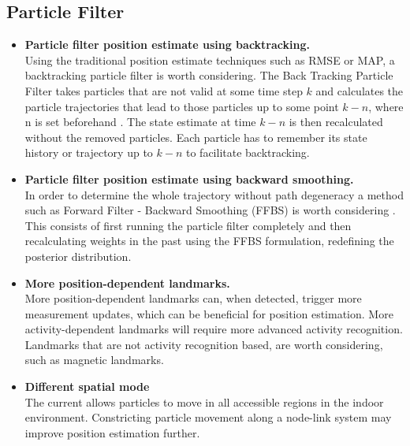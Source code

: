 \subsection{Particle Filter}

\begin{itemize}
	\item \textbf{Particle filter position estimate using backtracking.} \\
	Using the traditional position estimate techniques such as RMSE or MAP, a backtracking particle filter is worth considering. The Back Tracking Particle Filter takes particles that are not valid at some time step $ k $ and calculates the particle trajectories that lead to those particles up to some point $ k - n $, where n is set beforehand \cite{Widyawan2008}. The state estimate at time $ k-n $ is then recalculated without the removed particles. Each particle has to remember its state history or trajectory up to $ k-n $ to facilitate backtracking.
	
	\item \textbf{Particle filter position estimate using backward smoothing.}\\
	In order to determine the whole trajectory without path degeneracy a method such as Forward Filter - Backward Smoothing (FFBS) is worth considering \cite{Lindsten2013, Nurminen2013}. This consists of first running the particle filter completely and then recalculating weights in the past using the FFBS formulation, redefining the posterior distribution.
	
	\item \textbf{More position-dependent landmarks.}\\
	More position-dependent landmarks can, when detected, trigger more measurement updates, which can be beneficial for position estimation. More activity-dependent landmarks will require more advanced activity recognition. Landmarks that are not activity recognition based, are worth considering, such as magnetic landmarks.
	
	\item \textbf{Different spatial mode}\\
	The current allows particles to move in all accessible regions in the indoor environment. Constricting particle movement along a node-link system may improve position estimation further.
\end{itemize}
